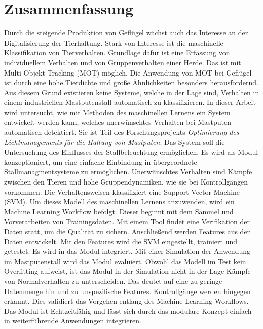 \section*{Zusammenfassung}
\vspace*{-5mm}
Durch die steigende Produktion von Geflügel wächst auch das Interesse an der Digitalisierung der Tierhaltung. Stark von Interesse ist die maschinelle Klassifikation von Tierverhalten. Grundlage dafür ist eine Erfassung von individuellem Verhalten und von Gruppenverhalten einer Herde. Das ist mit Multi-Objekt Tracking (MOT) möglich. Die Anwendung von MOT bei Geflügel ist durch eine hohe Tierdichte und große Ähnlichkeiten besonders herausfordernd. Aus diesem Grund existieren keine Systeme, welche in der Lage sind, Verhalten in einem industriellen Mastputenstall automatisch zu klassifizieren. In dieser Arbeit wird untersucht, wie mit Methoden des maschinellen Lernens ein System entwickelt werden kann, welches unerwünschtes Verhalten bei Mastputen automatisch detektiert. Sie ist Teil des Forschungsprojekts \textit{Optimierung des Lichtmanagements für die Haltung von Mastputen}. Das System soll die Untersuchung des Einflusses der Stallbeleuchtung ermöglichen. Es wird als Modul konzeptioniert, um eine einfache Einbindung in übergeordnete Stallmanagmentsysteme zu ermöglichen. Unerwünschtes Verhalten sind Kämpfe zwischen den Tieren und hohe Gruppendynamiken, wie sie bei Kontrollgängen vorkommen. Die Verhaltensweisen klassifiziert eine Support Vector Machine (SVM). Um dieses Modell des maschinellen Lernens anzuwenden, wird ein Machine Learning Workflow befolgt. Dieser beginnt mit dem Sammel und Vorverarbeiten von Trainingsdaten. Mit einem Tool findet eine Verifikation der Daten statt, um die Qualität zu sichern. Anschließend werden Features aus den Daten entwickelt. Mit den Features wird die SVM eingestellt, trainiert und getestet. Es wird in das Modul integriert. Mit einer Simulation der Anwendung im Mastputenstall wird das Modul evaluiert. Obwohl das Modell im Test kein Overfitting aufweist, ist das Modul in der Simulation nicht in der Lage Kämpfe von Normalverhalten zu unterscheiden. Das deutet auf eine zu geringe Datenmenge hin und zu unspezifische Features. Kontrollgänge werden hingegen erkannt. Dies validiert das Vorgehen entlang des Machine Learning Workflows. Das Modul ist Echtzeitfähig und lässt sich durch das modulare Konzept einfach in weiterführende Anwendungen integrieren. 
